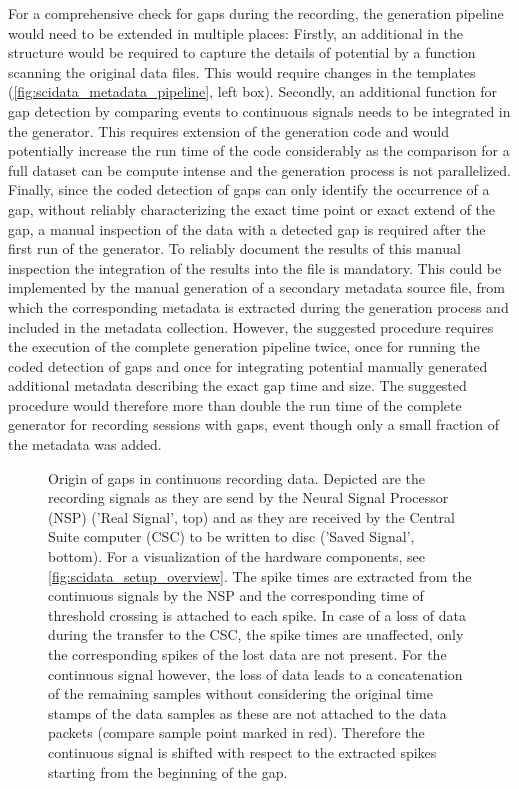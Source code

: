 For a comprehensive check for gaps during the recording, the  generation pipeline would need to be extended in multiple places: Firstly, an additional  in the  structure would be required to capture the details of potential by a function scanning the original data files. This would require changes in the  templates (\cref{fig:scidata_metadata_pipeline}, left box). Secondly, an additional function for gap detection by comparing events to continuous signals needs to be integrated in the  generator. This requires extension of the  generation code and would potentially increase the run time of the code considerably as the comparison for a full dataset can be compute intense and the  generation process is not parallelized. Finally, since the coded detection of gaps can only identify the occurrence of a gap, without reliably characterizing the exact time point or exact extend of the gap, a manual inspection of the data with a detected gap is required after the first run of the  generator. To reliably document the results of this manual inspection the integration of the results into the  file is mandatory. This could be implemented by the manual generation of a secondary metadata source file, from which the corresponding metadata is extracted during the  generation process and included in the metadata collection. However, the suggested procedure requires the execution of the complete  generation pipeline twice, once for running the coded detection of gaps and once for integrating potential manually generated additional metadata describing the exact gap time and size. The suggested procedure would therefore more than double the run time of the complete  generator for recording sessions with gaps, event though only a small fraction of the metadata was added.

\begin{figure}
 \centering
 
 \caption[Origin of gaps in continuous recording data]{Origin of gaps in continuous recording data. Depicted are the recording signals as they are send by the Neural Signal Processor (NSP) ('Real Signal', top) and as they are received by the Central Suite computer (CSC) to be written to disc ('Saved Signal', bottom). For a visualization of the hardware components, see \cref{fig:scidata_setup_overview}. The spike times are extracted from the continuous signals by the NSP and the corresponding time of threshold crossing is attached to each spike. In case of a loss of data during the transfer to the CSC, the spike times are unaffected, only the corresponding spikes of the lost data are not present. For the continuous signal however, the loss of data leads to a concatenation of the remaining samples without considering the original time stamps of the data samples as these are not attached to the data packets (compare sample point marked in red). Therefore the continuous signal is shifted with respect to the extracted spikes starting from the beginning of the gap.}
 \label{fig:scidata_gaps}
\end{figure}


